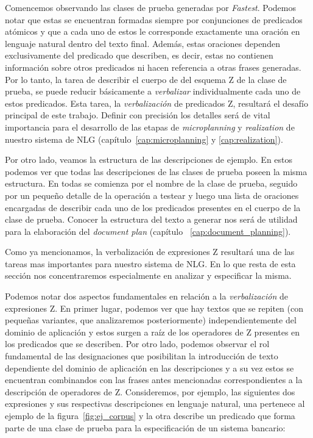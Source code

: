Comencemos observando las clases de prueba generadas por \emph{Fastest}. Podemos notar que estas se encuentran formadas siempre por conjunciones de predicados atómicos y que a cada uno de estos le corresponde exactamente una oración en lenguaje natural dentro del texto final. Además, estas oraciones dependen exclusivamente del predicado que describen, es decir, estas no contienen información sobre otros predicados ni hacen referencia a otras frases generadas. Por lo tanto, la tarea de describir el cuerpo de del esquema Z de la clase de prueba, se puede reducir básicamente a \emph{verbalizar} individualmente cada uno de estos predicados. Esta tarea, la \emph{verbalización} de predicados Z, resultará el desafío principal de este trabajo. Definir con precisión los detalles será de vital importancia para el desarrollo de las etapas de \emph{microplanning} y \emph{realization} de nuestro sistema de NLG (capítulo~\ref{cap:microplanning} y \ref{cap:realization}).

Por otro lado, veamos la estructura de las descripciones de ejemplo. En estos podemos ver que todas las descripciones de las clases de prueba poseen la misma estructura. En todas se comienza por el nombre de la clase de prueba, seguido por un pequeño detalle de la operación a testear y luego una lista de oraciones encargadas de describir cada uno de los predicados presentes en el cuerpo de la clase de prueba. Conocer la estructura del texto a generar nos será de utilidad para la elaboración del \emph{document plan} (capítulo ~\ref{cap:document_planning}).

Como ya mencionamos, la verbalización de expresiones Z resultará una de las tareas mas importantes para nuestro sistema de NLG. En lo que resta de esta sección nos concentraremos especialmente en analizar y especificar la misma.

Podemos notar dos aspectos fundamentales en relación a la \emph{verbalización} de expresiones Z. En primer lugar, podemos ver que hay textos que se repiten (con pequeñas variantes, que analizaremos posteriormente) independientemente del dominio de aplicación y estos surgen a raíz de los operadores de Z presentes en los predicados que se describen. Por otro lado, podemos observar el rol fundamental de las designaciones que posibilitan la introducción de texto dependiente del dominio de aplicación en las descripciones y a su vez estos se encuentran combinandos con las frases antes mencionadas correspondientes a la descripción de operadores de Z. Consideremos, por ejemplo, las siguientes dos expresiones y sus respectivas descripciones en lenguaje natural, una pertenece al ejemplo de la figura~\ref{fig:ej_corpus} y la otra describe un predicado que forma parte de una clase de prueba para la especificación de un sistema bancario:

